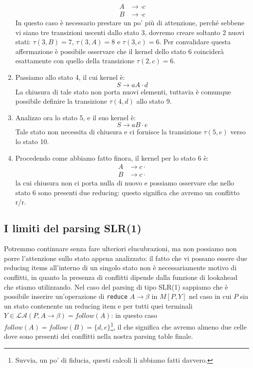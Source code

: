 \documentclass[class=book, crop=false, oneside, 12pt]{standalone}
\begin{document}
\begin{enumerate}
    \begin{align*}
        A &\to \cdot c \\
        B &\to \cdot c
    \end{align*}
    In questo caso è necessario prestare un po' più di attenzione, perché sebbene vi siano tre transizioni uscenti dallo stato 3, dovremo creare soltanto 2 nuovi stati: \(\tau(3,B)=7 \textrm{, } \tau(3,A)=8 \textrm{ e } \tau(3,c)=6\). Per convalidare questa affermazione è possibile osservare che il kernel dello stato 6 coinciderà esattamente con quello della transizione \(\tau(2, c)=6\).
    \item Passiamo allo stato 4, il cui kernel è:
    \begin{equation*}
        S \to aA \cdot d 
    \end{equation*}
   La chiusura di tale stato non porta nuovi elementi, tuttavia è comunque possibile definire la transizione \(\tau(4,d)\) allo stato 9.
    \item Analizzo ora lo stato 5, e il suo kernel è:
    \begin{equation*}
        S \to aB \cdot e
    \end{equation*}
    Tale stato non necessita di chiusura e ci fornisce la transizione \(\tau(5,e)\) verso lo stato 10.
    \item Procedendo come abbiamo fatto finora, il kernel per lo stato 6 è:
    \begin{align*}
        A &\to c \cdot \\
        B &\to c \cdot
    \end{align*}
    la cui chiusura non ci porta nulla di nuovo e possiamo osservare che nello stato 6 sono presenti due reducing: questo significa che avremo un conflitto r/r.
\end{enumerate}

\subsection{I limiti del parsing SLR(1)}
Potremmo continuare senza fare ulteriori elucubrazioni, ma non possiamo non porre l'attenzione sullo stato appena analizzato: il fatto che vi possano essere due reducing items all'interno di un singolo stato non è necessariamente motivo di conflitti, in quanto la presenza di conflitti dipende dalla funzione di lookahead che stiamo utilizzando. Nel caso del parsing di tipo SLR(1) sappiamo che è possibile inserire un'operazione di \texttt{reduce} \(A \rightarrow \beta\) in \(M[P, Y]\) nel caso in cui \(P\) sia un stato contenente un reducing item e per tutti quei terminali \(Y \in \mathcal{LA}(P, A \rightarrow \beta) = follow(A)\): in questo caso \(follow(A) = follow(B) = \{d, e\}\)\footnote{Suvvia, un po' di fiducia, questi calcoli li abbiamo fatti davvero.}, il che significa che avremo almeno due celle dove sono presenti dei conflitti nella nostra parsing table finale.
\end{document}
